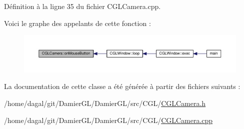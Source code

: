 Définition à la ligne 35 du fichier C\-G\-L\-Camera.\-cpp.



Voici le graphe des appelants de cette fonction \-:\nopagebreak
\begin{figure}[H]
\begin{center}
\leavevmode
\includegraphics[width=350pt]{de/dee/class_c_g_l_camera_ad0f4898351c8df558a627102f233ded8_icgraph}
\end{center}
\end{figure}




La documentation de cette classe a été générée à partir des fichiers suivants \-:\begin{DoxyCompactItemize}
\item 
/home/dagal/git/\-Damier\-G\-L/\-Damier\-G\-L/src/\-C\-G\-L/\hyperlink{_c_g_l_camera_8h}{C\-G\-L\-Camera.\-h}\item 
/home/dagal/git/\-Damier\-G\-L/\-Damier\-G\-L/src/\-C\-G\-L/\hyperlink{_c_g_l_camera_8cpp}{C\-G\-L\-Camera.\-cpp}\end{DoxyCompactItemize}
